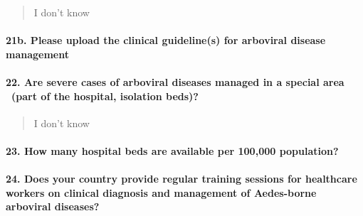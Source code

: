 \documentclass[
]{article}
\begin{document}
\begin{quote}
I don't know
\end{quote}

\hypertarget{b.-please-upload-the-clinical-guidelines-for-arboviral-disease-management}{%
\paragraph{21b. Please upload the clinical guideline(s) for arboviral
disease
management}\label{b.-please-upload-the-clinical-guidelines-for-arboviral-disease-management}}

\begin{quote}
\end{quote}

\hypertarget{are-severe-cases-of-arboviral-diseases-managed-in-a-special-area-part-of-the-hospital-isolation-beds}{%
\paragraph{22. Are severe cases of arboviral diseases managed in a
special area ~(part of the hospital, isolation
beds)?}\label{are-severe-cases-of-arboviral-diseases-managed-in-a-special-area-part-of-the-hospital-isolation-beds}}

\begin{quote}
I don't know
\end{quote}

\hypertarget{how-many-hospital-beds-are-available-per-100000-population}{%
\paragraph{23. How many hospital beds are available per 100,000
population?}\label{how-many-hospital-beds-are-available-per-100000-population}}

\begin{quote}
\end{quote}

\hypertarget{does-your-country-provide-regular-training-sessions-for-healthcare-workers-on-clinical-diagnosis-and-management-of-aedes-borne-arboviral-diseases}{%
\paragraph{24. Does your country provide regular training sessions for
healthcare workers on clinical diagnosis and management of Aedes-borne
arboviral
diseases?}\label{does-your-country-provide-regular-training-sessions-for-healthcare-workers-on-clinical-diagnosis-and-management-of-aedes-borne-arboviral-diseases}}
\end{document}
